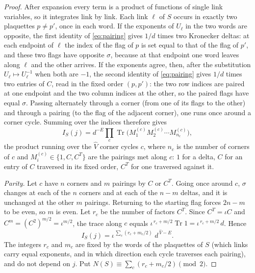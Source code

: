 \documentclass[11pt,a4paper]{amsart}
\theoremstyle{definition}
\theoremstyle{remark}
\numberwithin{equation}{section}
\DeclareMathOperator{\Tr}{Tr}        %
\begin{document}
\begin{proof}
After expansion every term is a product of functions of single link variables, so it integrates link by link. Each link $\ell$ of $S$ occurs in exactly two plaquettes $p\ne p'$, once in each word. If the exponents of $U_\ell$ in the two words are opposite, the first identity of \eqref{eq:pairing} gives $1/d$ times two Kronecker deltas: at each endpoint of $\ell$ the index of the flag of $p$ is set equal to that of the flag of $p'$, and these two flags have opposite $\sigma$, because at that endpoint one word leaves along $\ell$ and the other arrives. If the exponents agree, then, after the substitution $U_\ell\mapsto U_\ell^{-1}$ when both are $-1$, the second identity of \eqref{eq:pairing} gives $1/d$ times two entries of $C$, read in the fixed order $(p,p')$: the two row indices are paired at one endpoint and the two column indices at the other, so the paired flags have equal $\sigma$. Passing alternately through a corner (from one of its flags to the other) and through a pairing (to the flag of the adjacent corner), one runs once around a corner cycle. Summing over the indices therefore gives
\[
I_S(j)=d^{-E}\prod_{c}\Tr\bigl(M^{(c)}_1M^{(c)}_2\cdots M^{(c)}_{n_c}\bigr),
\]
the product running over the $\hat V$ corner cycles $c$, where $n_c$ is the number of corners of $c$ and $M^{(c)}_i\in\{1,C,C^T\}$ are the pairings met along $c$: $1$ for a delta, $C$ for an entry of $C$ traversed in its fixed order, $C^T$ for one traversed against it.

\emph{Parity.} Let $c$ have $n$ corners and $m$ pairings by $C$ or $C^T$. Going once around $c$, $\sigma$ changes at each of the $n$ corners and at each of the $n-m$ deltas, and it is unchanged at the other $m$ pairings. Returning to the starting flag forces $2n-m$ to be even, so $m$ is even. Let $r_c$ be the number of factors $C^T$. Since $C^T=\iota C$ and $C^m=(C^2)^{m/2}=\iota^{m/2}$, the trace along $c$ equals $\iota^{\,r_c+m/2}\Tr 1=\iota^{\,r_c+m/2}\,d$. Hence
\[
I_S(j)=\iota^{\,\sum_c(r_c+m_c/2)}\;d^{\,\hat V-E}.
\]
The integers $r_c$ and $m_c$ are fixed by the words of the plaquettes of $S$ (which links carry equal exponents, and in which direction each cycle traverses each pairing), and do not depend on $j$. Put $N(S)\equiv\sum_c(r_c+m_c/2)\pmod 2$.


\end{proof}
\end{document}
